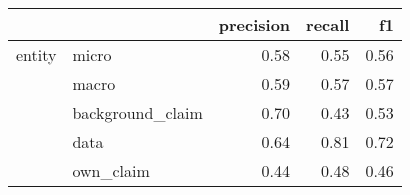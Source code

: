 \begin{tabular}{llrrr}
\toprule
       &           &  precision &  recall &   f1 \\
\midrule
entity & micro &       0.58 &    0.55 & 0.56 \\
       & macro &       0.59 &    0.57 & 0.57 \\
       & background\_claim &       0.70 &    0.43 & 0.53 \\
       & data &       0.64 &    0.81 & 0.72 \\
       & own\_claim &       0.44 &    0.48 & 0.46 \\
\bottomrule
\end{tabular}
